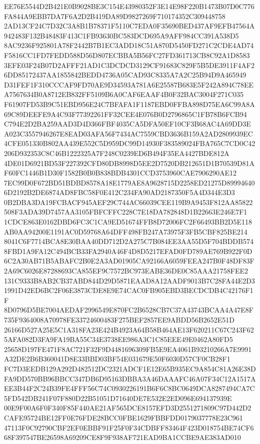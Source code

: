 \documentclass[UTF8,fontset=fandol,zihao=-4,a4paper]{ctexart}
\begin{document}
{{EE76E5544D2B421E0B9028BE3C154E43980352F3E14E98F220B1473B07D0C776FA844A9EBB7DA7F6A2D2B419DA89D9827269F710174352C309448758
2AD13CF24C7D32C3A8B1B78371F5110C7EDA0F35690BED437AF9EFB47564A942483F132B48483F413C1FB93630BC583DCD695A9AFF984CC391A538D5
8AC9236F925801A78F2442B7B1EC3ADD18C51A870D5450FD271C2CDE4AD74F5816CC1FD7FEDD588D56D807ECBBA5B56FC27FD361713CB8C92A1D8583
3EFE03F24B07D2AFFF21AD1C3DCDCD3129CF91683C829F5B5DE3911F4AF26DD85172437AA1855842BEDD4736A05CAD93C8335A7A2C25B94D9A465949
D31FEF1F310CCCAF9FD70AE9D34593A781A6E25587B683E5F242A894C78EEA7567634B0A8712EB832FF5109B6A0CAF6EAAF4B0F32BAC3004F271C035
F61907FD53B9C51EBD956E24C7BFAFA1F1187EBD0FFBA898D75EA6C99A8A69C89DEEFE9A4C93F77392261FF32CEE4E076B0D2796865C1FB78B6FCB94
C794E2D2BA259AAD3D4D366FBF4035CA5DFA50EF10CF3B68AC4A69DD3EA023C3557946267E8EAD03AFA56F7434AC7559CBD3636B159A2AD2809939EC
4CFE051330B802AA439E552C5D959DC99D14930F383589024FBA765C7CD0C42206D932353C8C46B1222325A7F248C0239ED6B494F35EA4427BDE812A
4DE01D6921BD53F227392CFD80DB8998D5EE2D7520DB212651D1B70539D81AF60FC1446B1D30F1582B0B0B838BDB4301CCD3753960CAE7906290AE12
7EC99D0F672BD51BDBD8578A18E1779AE8A9628715D2258ED21275D899946406D2192B2DE6874AD8FBC58F0E412C234FA90AD2187350F5A4D344E3D3
0B2DBA3DA19FCBACF945AEF29C744AC66039CEE119B9A9453F812AA85822508F3ADA39D7457AA3105FBFCFFC228C7E18DA782848D1B22663E246E7F1
1CDCE863E0162DBD6FC3C1CA9ED51674FFB8D72006FC2F66493BB2D5E118AB0AA94200E1191AC0D59768A64DFF498FB247A73975F3FB5CBF825BE214
8041C6F7714BCA8E30BAA40DD712D2A275C7B084EE3AA55D5F704BDDB5748FBD1A9FA12C494BCB33FA2940A46F4D8D5217EFAD0FD789AE769B922F0D
6C2A30AB71B5ABAFC2B0E2A3AD01905CA92166A6059FEEA247B0F48DF83F2A69C6026E87288693CA855EF9C7572BC973EABE36DE0C85AAA21758FEE2
131C9333B8AB2CB37ABD844D29D5871EAAD8A12AADF9013B7C28FA44E2D31991D42ED6BC2F06E3873CDE8E9E74CAC0FB905EBD3BECDCDB4C42176F1F
8D0796D5BE7004AEDAF2996549E870FC2B6528CB7C37A43743BCAA4A47E8F735F9364008A70978FE33724600483F275BEF2857EE9ABDD56B2652E51D
26166D527A25E5C1A318FA23E424B4923A64B58B464AE13F620211C67C243F625AFA082D3FA9FA19BA55C34E3738EE986A3C1C85EEE49E0462A80FD5
25658D197FE471F8AC721F32F9D4481696309FB5E9EA4061B93210266A7E9991A32DE2B6B360041D8E33BBD03BF54E031679E50F6030D57CF0CB28F1
FC7D3EEDB129A292D482512DC2321ADCF1E12E65B935EC9A854C81A26E38DFA9DD570BB96BBCC347DB6D95163DBBA3A46DAAAFC46A07F34C12A1517A
EE3B44F2C24B39FE4FFF56C74C0930226191B6F6C8BC0649DCA8287494CA7C5FD542DB241F07F880D22B51051D71640DE7E532E2ED096E694137939E
00E9F00A6F0F340F85F440AE21AF565DCE8157EFD3D2551271809C97D442D2CAFE95724BE12FF0E76FDE28BCC0FBE1629FBBFDD0179037778E23C961
47113F0C92790CBF2EF0EBBF91F25F0F34CDBFF83464F423D018754BE74CF668F397547BE26598A69209CE8F9F938AF721EAD9BA1CCBE9AE383AD010
}}
\end{document}
